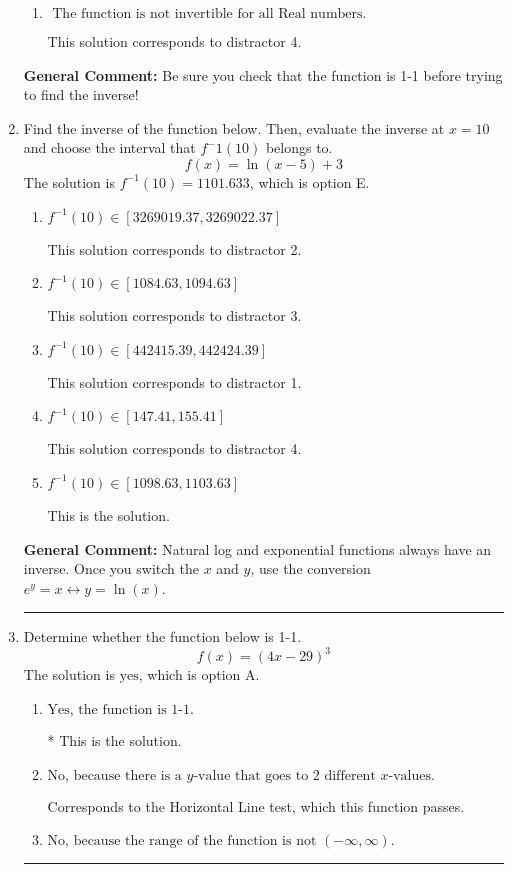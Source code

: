\documentclass{extbook}[14pt]
\newcommand{\litem}[1]{\item #1

\rule{\textwidth}{0.4pt}}
\begin{document}
\begin{enumerate}
{\begin{enumerate}[label=\Alph*.]
 This solution corresponds to distractor 2.
\item \( \text{ The function is not invertible for all Real numbers. } \)

 This solution corresponds to distractor 4.
\end{enumerate}

\textbf{General Comment:} Be sure you check that the function is 1-1 before trying to find the inverse!
}
\litem{
Find the inverse of the function below. Then, evaluate the inverse at $x = 10$ and choose the interval that $f^-1(10)$ belongs to.
\[ f(x) = \ln{(x-5)}+3 \]The solution is \( f^{-1}(10) = 1101.633 \), which is option E.\begin{enumerate}[label=\Alph*.]
\item \( f^{-1}(10) \in [3269019.37, 3269022.37] \)

 This solution corresponds to distractor 2.
\item \( f^{-1}(10) \in [1084.63, 1094.63] \)

 This solution corresponds to distractor 3.
\item \( f^{-1}(10) \in [442415.39, 442424.39] \)

 This solution corresponds to distractor 1.
\item \( f^{-1}(10) \in [147.41, 155.41] \)

 This solution corresponds to distractor 4.
\item \( f^{-1}(10) \in [1098.63, 1103.63] \)

 This is the solution.
\end{enumerate}

\textbf{General Comment:} Natural log and exponential functions always have an inverse. Once you switch the $x$ and $y$, use the conversion $ e^y = x \leftrightarrow y=\ln(x)$.
}
\litem{
Determine whether the function below is 1-1.
\[ f(x) = (4 x - 29)^3 \]The solution is \( \text{yes} \), which is option A.\begin{enumerate}[label=\Alph*.]
\item \( \text{Yes, the function is 1-1.} \)

* This is the solution.
\item \( \text{No, because there is a $y$-value that goes to 2 different $x$-values.} \)

Corresponds to the Horizontal Line test, which this function passes.
\item \( \text{No, because the range of the function is not $(-\infty, \infty)$.} \)


\end{enumerate}}
\end{enumerate}
\end{document}
